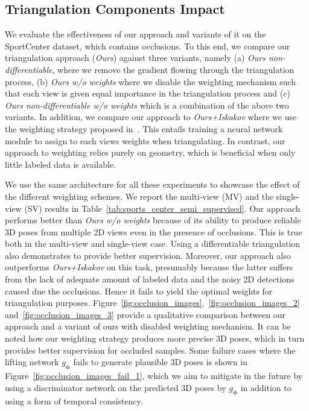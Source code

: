\documentclass[runningheads]{llncs}
\def\Mat#1{{\boldsymbol{#1}}}
\begin{document}
\subsection*{Triangulation Components Impact}
\label{sec:triangle_component}
We evaluate the effectiveness of our approach and variants of it on the SportCenter dataset, which contains occlusions. To this end, we compare our triangulation approach ({\it Ours}) against three variants, namely (a) {\it Ours non-differentiable}, where we remove the gradient flowing through the triangulation process, (b) {\it Ours w/o weights} where we disable the weighting mechanism such that each view is given equal importance in the triangulation process and (c) {\it Ours non-differentiable w/o weights} which is a combination of the above two variants. In addition, we compare our approach to {\it Ours+Iskakov} where we use the weighting strategy proposed in~\cite{Iskakov19}. This entails training a neural network module to assign to each views weights when triangulating. In contrast, our approach to weighting relies purely on geometry, which is beneficial when only little labeled data is available. 

We use the same architecture for all these experiments to showcase the effect of the different weighting schemes. We report the multi-view (MV) and the single-view (SV) results in Table~\ref{tab:sports_center_semi_supervised}. Our approach performs better than {\it Ours w/o weights} because of its ability to produce reliable 3D poses from multiple 2D views even in the presence of occlusions. This is true both in the multi-view and single-view case. Using a differentiable triangulation also demonstrates to provide better supervision. Moreover, our approach also outperforms {\it Ours+Iskakov} on this task, presumably because the latter suffers from the lack of adequate amount of labeled data and the noisy 2D detections caused due the occlusions. Hence it fails to yield the optimal weights for triangulation purposes. Figure~\ref{fig:occlusion_images},~\ref{fig:occlusion_images_2} and~\ref{fig:occlusion_images_3} provide a qualitative comparison between our approach and a variant of ours with disabled weighting mechanism. It can be noted how our weighting strategy produces more precise 3D poses, which in turn provides better supervision for occluded samples. Some failure cases where the lifting network $g_{\Mat{\phi}}$ fails to generate plausible 3D poses is shown in Figure~\ref{fig:occlusion_images_fail_1}, which we aim to mitigate in the future by using a discriminator network on the predicted 3D poses by $g_{\Mat{\phi}}$ in addition to using a form of temporal consistency.
\end{document}
